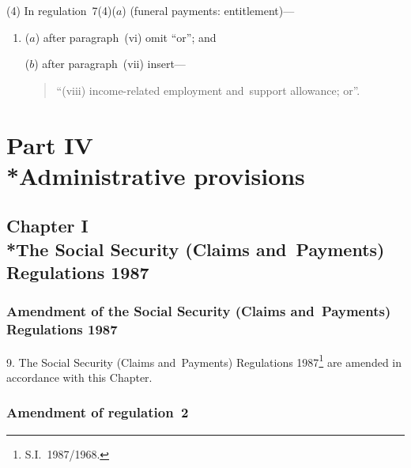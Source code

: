 \documentclass[12pt,a4paper]{article}
\begin{document}
(4) In regulation~7(4)($a$)  (funeral payments: entitlement)—
\begin{enumerate}\item[]
($a$) after paragraph~(vi)  omit “or”; and

($b$) after paragraph~(vii)  insert—
\begin{quotation}
“(viii) income-related employment and~support allowance; or”.
\end{quotation}
\end{enumerate}

\section[Part IV --- Administrative provisions]{Part IV\\*Administrative provisions}

\subsection[Chapter I --- The Social Security (Claims and~Payments) Regulations 1987]{Chapter I\\*The Social Security (Claims and~Payments) Regulations 1987}

\renewcommand\parthead{--- Part IV Chapter I}

\subsubsection[9. Amendment of the Social Security (Claims and~Payments) Regulations 1987]{Amendment of the Social Security (Claims and~Payments) Regulations 1987}

9.  The Social Security (Claims and~Payments) Regulations 1987\footnote{S.I.~1987/1968.} are amended in accordance with this Chapter.

\subsubsection[10. Amendment of regulation~2]{Amendment of regulation~2}
\end{document}
